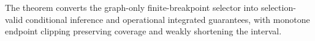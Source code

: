 The theorem converts the graph-only finite-breakpoint selector into selection-valid conditional inference and operational integrated guarantees, with monotone endpoint clipping preserving coverage and weakly shortening the interval.